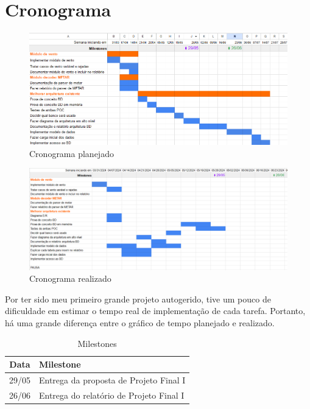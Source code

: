 \chapter{Cronograma}


\begin{figure}[ht]
    \begin{center}
    \includegraphics[width=400pt]{img/cronograma.png}
    \caption{Cronograma planejado}
    \label{fig:cronograma-planejado}
    \end{center}
\end{figure}

\begin{figure}[ht]
    \begin{center}
    \includegraphics[width=400pt]{img/realizado.png}
    \caption{Cronograma realizado}
    \label{fig:cronograma-realizado}
    \end{center}
\end{figure}

Por ter sido meu primeiro grande projeto autogerido, tive um pouco de dificuldade em 
estimar o tempo real de implementação de cada tarefa. Portanto, há uma grande diferença entre o 
gráfico de tempo planejado e realizado.

\begin{table}[h]
    \centering
    \caption{Milestones}
    \begin{tabular}{|c|l|}
        \hline
        \textbf{Data} & \textbf{Milestone} \\
        \hline
        29/05 & Entrega da proposta de Projeto Final I \\
        26/06 & Entrega do relatório de Projeto Final I \\
        \hline
    \end{tabular}
\end{table}

